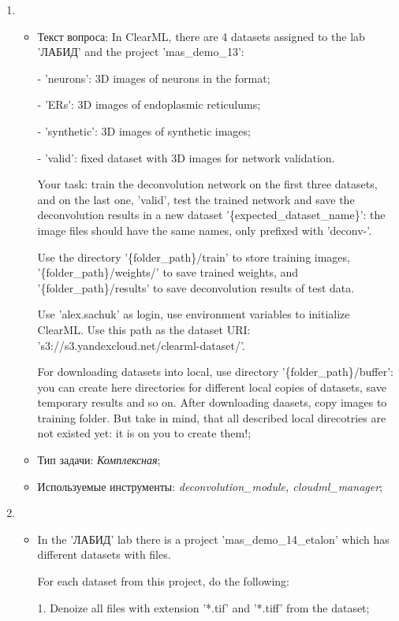 \begin{enumerate}
	\item \begin{itemize}
		\item Текст вопроса: In ClearML, there are 4 datasets
assigned to the lab 'ЛАБИД' and the project 'mas\_demo\_13':

- 'neurons': 3D images of neurons in the format;

- 'ERs': 3D images of endoplasmic reticulums;

- 'synthetic': 3D images of synthetic images;

- 'valid': fixed dataset with 3D images for network validation.

Your task: train the deconvolution network on the first three datasets,
and on the last one, 'valid', test the trained network
and save the deconvolution results in a new dataset
'\{expected\_dataset\_name\}': the image files should have the same names,
only prefixed with 'deconv-'.

Use the directory '\{folder\_path\}/train' to store training images,
'\{folder\_path\}/weights/' to save trained weights, and
'\{folder\_path\}/results' to save deconvolution results of test data.
											
Use 'alex.sachuk' as login, use environment variables to initialize ClearML.
Use this path as the dataset URI: 's3://s3.yandexcloud.net/clearml-dataset/'.
											
For downloading datasets into local, use directory '\{folder\_path\}/buffer': 
you can create here directories for different local copies of datasets,
save temporary results and so on. After downloading daasets, copy images to training folder. 
But take in mind, that all described local direcotries are not existed yet: it is on you to create them!;
		\item Тип задачи: \textit{Комплексная};
		\item Используемые инструменты: \textit{deconvolution\_module, cloudml\_manager};
	\end{itemize}

	\item \begin{itemize}
		\item In the 'ЛАБИД' lab there is
a project 'mas\_demo\_14\_etalon' which has different datasets with files. 
											
For each dataset from this project, do the following:

1. Denoize all files with extension '*.tif' and '*.tiff' from the dataset;


\end{itemize}
\end{enumerate}
